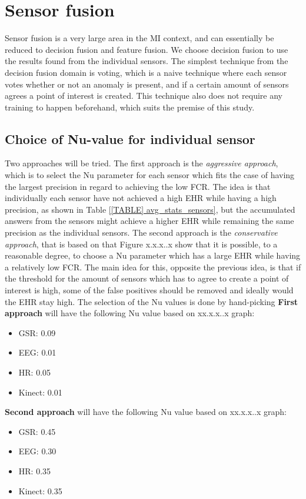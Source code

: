 \section{Sensor fusion}
Sensor fusion is a very large area in the MI context, and can essentially be reduced to decision fusion and feature fusion. 
We choose decision fusion to use the results found from the individual sensors.
The simplest technique from the decision fusion domain is voting, which is a naive technique where each sensor votes whether or not an anomaly is present, and if a certain amount of sensors agrees a point of interest is created. This technique also does not require any training to happen beforehand, which suits the premise of this study.

\subsection{Choice of Nu-value for individual sensor}
Two approaches will be tried. The first approach is the \textit{aggressive approach}, which is to select the Nu parameter for each sensor which fits the case of having the largest precision in regard to achieving the low FCR. The idea is that individually each sensor have not achieved a high EHR while having a high precision, as shown in Table \ref{[TABLE] avg_stats_sensors}, but the accumulated answers from the sensors might achieve a higher EHR while remaining the same precision as the individual sensors.
The second approach is the \textit{conservative approach}, that is based on that Figure x.x.x..x show that it is possible, to a reasonable degree, to choose a Nu parameter which has a large EHR while having a relatively low FCR. The main idea for this, opposite the previous idea, is that if the threshold for the amount of sensors which has to agree to create a point of interest is high, some of the false positives should be removed and ideally would the EHR stay high.
The selection of the Nu values is done by hand-picking \textbf{First approach} will have the following Nu value based on xx.x.x..x graph:
\begin{itemize}
\item GSR: 0.09
\item EEG: 0.01
\item HR: 0.05
\item Kinect: 0.01
\end{itemize}
\textbf{Second approach} will have the following Nu value based on xx.x.x..x graph:
\begin{itemize}
\item GSR: 0.45
\item EEG: 0.30
\item HR: 0.35
\item Kinect: 0.35
\end{itemize}

